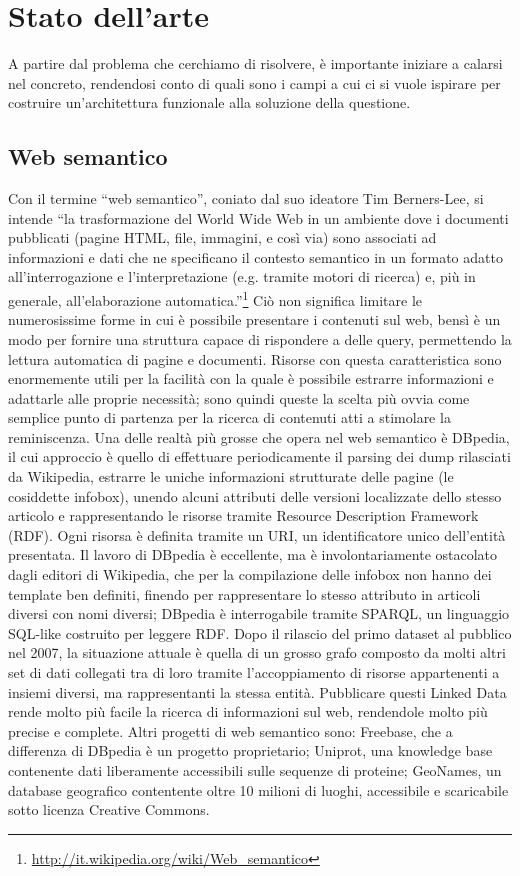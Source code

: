 \documentclass[sigproc-sp.tex]{subfiles}
\begin{document}
\section{Stato dell'arte}
A partire dal problema che cerchiamo di risolvere, è importante iniziare a calarsi nel concreto, rendendosi conto di quali sono i campi a cui ci si vuole ispirare per costruire un’architettura funzionale alla soluzione della questione.

\subsection{Web semantico}
Con il termine “web semantico”, coniato dal suo ideatore Tim Berners-Lee, si intende “la trasformazione del World Wide Web in un ambiente dove i documenti pubblicati (pagine HTML, file, immagini, e così via) sono associati ad informazioni e dati che ne specificano il contesto semantico in un formato adatto all'interrogazione e l'interpretazione (e.g. tramite motori di ricerca) e, più in generale, all'elaborazione automatica.”\footnote{\url{http://it.wikipedia.org/wiki/Web_semantico}}
Ciò non significa limitare le numerosissime forme in cui è possibile presentare i contenuti sul web, bensì è un modo per fornire una struttura capace di rispondere a delle query, permettendo la lettura automatica di pagine e documenti. 
Risorse con questa caratteristica sono enormemente utili per la facilità con la quale è possibile estrarre informazioni e adattarle alle proprie necessità; sono quindi queste la scelta più ovvia come semplice punto di partenza per la ricerca di contenuti atti a stimolare la reminiscenza.
Una delle realtà più grosse che opera nel web semantico è DBpedia, il cui approccio è quello di effettuare periodicamente il parsing dei dump rilasciati da Wikipedia, estrarre le uniche informazioni strutturate delle pagine (le cosiddette infobox), unendo alcuni attributi delle versioni localizzate dello stesso articolo e rappresentando le risorse tramite Resource Description Framework (RDF). Ogni risorsa è definita tramite un URI, un identificatore unico dell’entità presentata. Il lavoro di DBpedia è eccellente, ma è involontariamente ostacolato dagli editori di Wikipedia, che per la compilazione delle infobox non hanno dei template ben definiti, finendo per rappresentare lo stesso attributo in articoli diversi con nomi diversi; DBpedia è interrogabile tramite SPARQL, un linguaggio SQL-like costruito per leggere RDF. Dopo il rilascio del primo dataset al pubblico nel 2007, la situazione attuale è quella di un grosso grafo composto da molti altri set di dati collegati tra di loro tramite l’accoppiamento di risorse appartenenti a insiemi diversi, ma rappresentanti la stessa entità. Pubblicare questi Linked Data rende molto più facile la ricerca di informazioni sul web, rendendole molto più precise e complete. Altri progetti di web semantico sono: Freebase, che a differenza di DBpedia è un progetto proprietario; Uniprot, una knowledge base contenente dati liberamente accessibili sulle sequenze di proteine; GeoNames, un database geografico contentente oltre 10 milioni di luoghi, accessibile e scaricabile sotto licenza Creative Commons.
\end{document}
